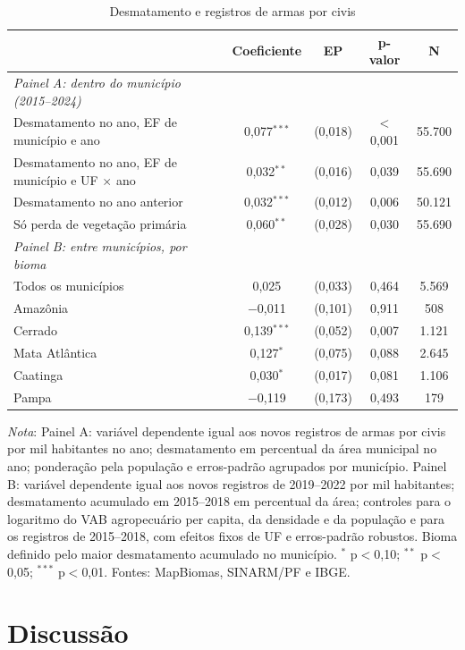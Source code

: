 \documentclass[11pt,a4paper]{article}
\newcommand{\nota}[1]{\par\vspace{2pt}\begin{minipage}{\linewidth}\footnotesize\textit{Nota}: #1\end{minipage}}
\begin{document}
\begin{table}[H]
\centering\footnotesize\setlength{\tabcolsep}{4pt}
\caption{Desmatamento e registros de armas por civis}\label{tab:desm}
\begin{tabular}{lcccc}
\toprule
 & Coeficiente & EP & p-valor & N \\
\midrule
\textit{Painel A: dentro do município (2015--2024)} &  &  &  &  \\
Desmatamento no ano, EF de município e ano & 0{,}077$^{***}$ & (0{,}018) & $<$0{,}001 & 55.700 \\
Desmatamento no ano, EF de município e UF $\times$ ano & 0{,}032$^{**}$ & (0{,}016) & 0{,}039 & 55.690 \\
Desmatamento no ano anterior & 0{,}032$^{***}$ & (0{,}012) & 0{,}006 & 50.121 \\
Só perda de vegetação primária & 0{,}060$^{**}$ & (0{,}028) & 0{,}030 & 55.690 \\
\midrule
\textit{Painel B: entre municípios, por bioma} &  &  &  &  \\
Todos os municípios & 0{,}025 & (0{,}033) & 0{,}464 & 5.569 \\
Amazônia & $-$0{,}011 & (0{,}101) & 0{,}911 & 508 \\
Cerrado & 0{,}139$^{***}$ & (0{,}052) & 0{,}007 & 1.121 \\
Mata Atlântica & 0{,}127$^{*}$ & (0{,}075) & 0{,}088 & 2.645 \\
Caatinga & 0{,}030$^{*}$ & (0{,}017) & 0{,}081 & 1.106 \\
Pampa & $-$0{,}119 & (0{,}173) & 0{,}493 & 179 \\
\bottomrule
\end{tabular}
\nota{Painel A: variável dependente igual aos novos registros de armas por civis por mil habitantes no ano; desmatamento em percentual da área municipal no ano; ponderação pela população e erros-padrão agrupados por município. Painel B: variável dependente igual aos novos registros de 2019--2022 por mil habitantes; desmatamento acumulado em 2015--2018 em percentual da área; controles para o logaritmo do VAB agropecuário per capita, da densidade e da população e para os registros de 2015--2018, com efeitos fixos de UF e erros-padrão robustos. Bioma definido pelo maior desmatamento acumulado no município. $^{*}$ p$<$0,10; $^{**}$ p$<$0,05; $^{***}$ p$<$0,01. Fontes: MapBiomas, SINARM/PF e IBGE.}
\end{table}

\section{Discussão}\label{sec:discussao}
\end{document}
